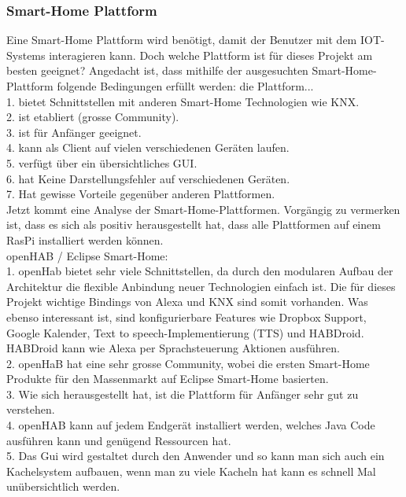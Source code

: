 \subsubsection{Smart-Home Plattform}
\label{subsubsec: Smart-Home Plattform}
Eine Smart-Home Plattform wird benötigt, damit der Benutzer mit dem IOT-Systems interagieren kann. Doch welche Plattform ist für dieses Projekt am besten geeignet?
Angedacht ist, dass mithilfe der ausgesuchten Smart-Home-Plattform folgende Bedingungen erfüllt werden: die Plattform...\\
1. bietet Schnittstellen mit anderen Smart-Home Technologien wie KNX.\\
2. ist etabliert (grosse Community).\\
3. ist für Anfänger geeignet.\\
4. kann als Client auf vielen verschiedenen Geräten laufen.\\
5. verfügt über ein übersichtliches GUI.\\
6. hat Keine Darstellungsfehler auf verschiedenen Geräten.\\
7. Hat gewisse Vorteile gegenüber anderen Plattformen.\\
Jetzt kommt eine Analyse der Smart-Home-Plattformen. Vorgängig zu vermerken ist, dass es sich als positiv herausgestellt hat, dass alle Plattformen auf einem RasPi installiert werden können.\\
openHAB / Eclipse Smart-Home:\\
1. openHab bietet sehr viele Schnittstellen, da durch den modularen Aufbau der Architektur die flexible Anbindung neuer Technologien einfach ist. Die für dieses Projekt wichtige Bindings von Alexa und KNX sind somit vorhanden. Was ebenso interessant ist, sind konfigurierbare Features wie Dropbox Support, Google Kalender, Text to speech-Implementierung (TTS) und HABDroid. HABDroid kann wie Alexa per Sprachsteuerung Aktionen ausführen. \cite{st33zy_media_mqtt_nodate}\\
2. openHaB hat eine sehr grosse Community, wobei die ersten Smart-Home Produkte für den Massenmarkt auf Eclipse Smart-Home basierten. \cite{st33zy_media_mqtt_nodate}\\
3. Wie sich herausgestellt hat, ist die Plattform für Anfänger sehr gut zu verstehen.\\
4. openHAB kann auf jedem Endgerät installiert werden, welches Java Code ausführen kann und genügend Ressourcen hat. \cite{st33zy_media_mqtt_nodate}\\
5. Das Gui wird gestaltet durch den Anwender und so kann man sich auch ein Kachelsystem aufbauen, wenn man zu viele Kacheln hat kann es schnell Mal unübersichtlich werden.\\
